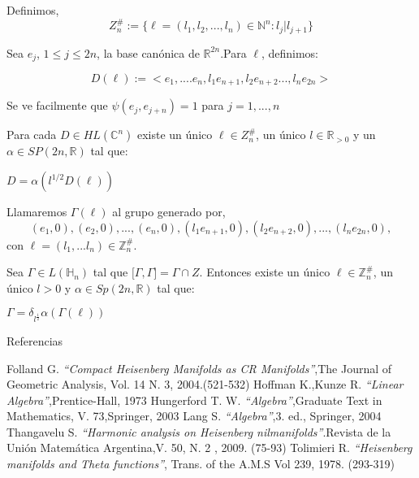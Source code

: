 \documentclass{beamer}
\begin{document}
\begin{frame}
 \begin{example} 
 Definimos,
 $$Z_n^{\#}:= \{ \ell=(l_1,l_2,...,l_n) \in \mathbb{N}^n:l_j|l_{j+1} \}$$
 
 Sea $e_j$, $1\leq j \leq 2n $,  la base canónica de $\mathbb{R}^{2n}$.Para $\ell$, definimos:
 
 $$D(\ell):=<e_1,....e_n,l_1 e_{n+1},l_2 e_{n+2}...,l_n e_{2n}>$$
  
 
 Se ve facilmente que $\psi(e_j,e_{j+n})=1$ para $j=1,...,n$
\end{example}
\end{frame}

\begin{frame}
 \begin{theorem}
 Para cada $D \in HL(\mathbb{C}^n)$ existe un único $\ell \in Z_n^{\#}$, un único $l \in \mathbb{R}_{>0}$ y un $\alpha \in SP(2n,\mathbb{R})$ tal que:
 
 $D=\alpha(l^{1/2} D(\ell))$
\end{theorem}
\end{frame}

\begin{frame}
 \begin{definition}
 Llamaremos $\Gamma(\ell)$ al grupo generado por,
 $${(e_1,0),(e_2,0),...,(e_n,0),(l_1 e_{n+1},0),(l_2 e_{n+2},0),...,(l_n e_{2n},0)},$$
 con $\ell=(l_1,...l_n) \in \mathbb{Z}_n^{\#}$.
\end{definition}

\begin{corollary}
 Sea $\Gamma \in L(\mathbb{H}_n)$ tal que ${[}\Gamma,\Gamma{]}=\Gamma \cap Z$. Entonces existe un único $\ell \in  \mathbb{Z}_n^{\#}$, un único $l> 0$  y $\alpha \in Sp(2n,\mathbb{R})$ 
 tal que:
 
 $\Gamma = \delta_{l^{\frac{1}{2}}} \alpha (\Gamma(\ell))$
\end{corollary}

\end{frame}









 \begin{frame}{Referencias}
  \begin{thebibliography}{1}
   Folland G.  \emph{``Compact Heisenberg Manifolds as CR Manifolds''},The Journal of Geometric Analysis, Vol. 14 N. 3, 2004.(521-532)
   Hoffman K.,Kunze R.  \emph{``Linear Algebra''},Prentice-Hall, 1973  
   Hungerford T. W.  \emph{``Algebra''},Graduate Text in Mathematics, V. 73,Springer, 2003
   Lang S.  \emph{``Algebra''},3. ed., Springer, 2004
   Thangavelu S.  \emph{``Harmonic analysis on Heisenberg nilmanifolds''}.Revista de la Unión Matemática Argentina,V. 50, N. 2 , 2009. (75-93)
   Tolimieri R.   \emph{``Heisenberg manifolds and Theta functions''}, Trans. of the A.M.S Vol 239, 1978. (293-319)  
  \end{thebibliography}
\end{frame}
\end{document}
